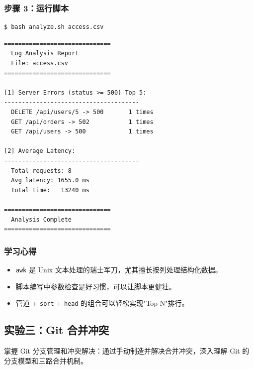 \documentclass[12pt,a4paper]{article}
\begin{document}
\subsubsection{步骤 3：运行脚本}

\begin{lstlisting}[style=shellstyle, caption={Run log analysis}]
$ bash analyze.sh access.csv
\end{lstlisting}

\begin{resultbox}
\begin{verbatim}
==============================
  Log Analysis Report
  File: access.csv
==============================

[1] Server Errors (status >= 500) Top 5:
--------------------------------------
  DELETE /api/users/5 -> 500       1 times
  GET /api/orders -> 502           1 times
  GET /api/users -> 500            1 times

[2] Average Latency:
--------------------------------------
  Total requests: 8
  Avg latency: 1655.0 ms
  Total time:   13240 ms

==============================
  Analysis Complete
==============================
\end{verbatim}
\end{resultbox}

\subsubsection{学习心得}

\begin{itemize}[leftmargin=2em]
    \item \texttt{awk} 是 Unix 文本处理的瑞士军刀，尤其擅长按列处理结构化数据。
    \item 脚本编写中参数检查是好习惯，可以让脚本更健壮。
    \item 管道 + \texttt{sort} + \texttt{head} 的组合可以轻松实现"Top N"排行。
\end{itemize}

\newpage
\subsection{实验三：Git 合并冲突}

\begin{goalbox}
掌握 Git 分支管理和冲突解决：通过手动制造并解决合并冲突，深入理解 Git 的分支模型和三路合并机制。
\end{goalbox}
\end{document}

